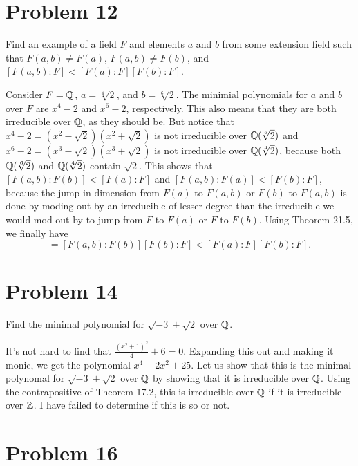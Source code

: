 \documentclass{article}
\begin{document}
\section*{Problem 12}

Find an example of a field $F$ and elements $a$ and $b$ from
some extension field such that $F(a,b)\neq F(a)$, $F(a,b)\neq F(b)$, and
$[F(a,b):F]<[F(a):F][F(b):F]$.

Consider $F=\mathbb{Q}$, $a=\sqrt[4]{2}$, and $b=\sqrt[6]{2}$.  The minimial polynomials
for $a$ and $b$ over $F$ are $x^4-2$ and $x^6-2$, respectively.  This also means that they are
both irreducible over $\mathbb{Q}$, as they should be.  
But notice that $x^4-2=(x^2-\sqrt{2})(x^2+\sqrt{2})$ is not irreducible over $\mathbb{Q}(\sqrt[6]{2})$
and $x^6-2=(x^3-\sqrt{2})(x^3+\sqrt{2})$ is not irreducible over $\mathbb{Q}(\sqrt[4]{2})$, because
both $\mathbb{Q}(\sqrt[6]{2})$ and $\mathbb{Q}(\sqrt[4]{2})$ contain $\sqrt{2}$.
This shows that $[F(a,b):F(b)]<[F(a):F]$ and $[F(a,b):F(a)]<[F(b):F]$, because the
jump in dimension from $F(a)$ to $F(a,b)$ or $F(b)$ to $F(a,b)$ is done by moding-out by
an irreducible of lesser degree than the irreducible we would mod-out by to jump
from $F$ to $F(a)$ or $F$ to $F(b)$.
Using Theorem 21.5, we finally have
\begin{equation*}
[F(a,b):F]=[F(a,b):F(b)][F(b):F]<[F(a):F][F(b):F].
\end{equation*}

\section*{Problem 14}

Find the minimal polynomial for $\sqrt{-3}+\sqrt{2}$ over $\mathbb{Q}$.

It's not hard to find that $\frac{(x^2+1)^2}{4}+6=0$.  Expanding this out and making it monic,
we get the polynomial $x^4+2x^2+25$.  Let us show that this is the minimal
polynomal for $\sqrt{-3}+\sqrt{2}$ over $\mathbb{Q}$
by showing that it is irreducible over $\mathbb{Q}$.
Using the contrapositive of Theorem 17.2, this is irreducible over $\mathbb{Q}$ if it is
irreducible over $\mathbb{Z}$.  I have failed to determine if this is so or not.

\section*{Problem 16}
\end{document}
